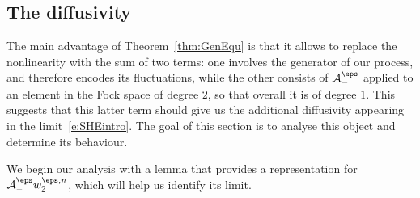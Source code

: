 \documentclass[reqno,11pt]{preprint}
\newcommand{\wN}{w^{\eps,n}}
\newcommand{\cA}{\mathcal{A}}
\newcommand{\1}{\mathds{1}}
\newcommand{\genam}{\cA^{\eps}_-}
\begin{document}
 
\subsection{The diffusivity}

The main advantage of Theorem~\ref{thm:GenEqu} is that it allows to replace the nonlinearity with 
the sum of two terms: one involves the generator of our process, and therefore encodes its fluctuations, 
while the other consists of $\genam$ applied to an element in the Fock space of degree $2$, 
so that overall it is of degree $1$. This suggests that this latter term should give us the additional 
diffusivity appearing in the limit~\eqref{e:SHEintro}. 
The goal of this section is to analyse this object and determine its behaviour. 

We begin our analysis with a lemma that provides a representation for $\genam\wN_2$, 
which will help us identify its limit. 
\end{document}
